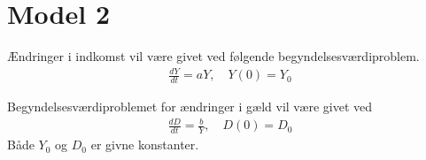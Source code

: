 \section{Model 2}

Ændringer i indkomst vil være givet ved følgende begyndelsesværdiproblem.
\begin{align}
    \frac{dY}{dt} = aY, \quad Y(0) = Y_0
\end{align}

Begyndelsesværdiproblemet for ændringer i gæld vil være givet ved
\begin{align}
    \frac{dD}{dt} = \frac{b}{Y}, \quad D(0) = D_0
\end{align}
Både $Y_0$ og $D_0$ er givne konstanter.